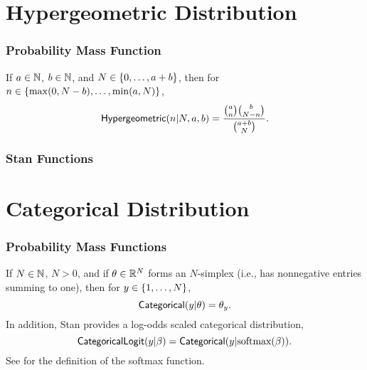 \section{Hypergeometric Distribution}

\subsubsection{Probability Mass Function}

If $a \in \mathbb{N}$, $b \in \mathbb{N}$, and $N \in \{ 0,\ldots,a+b \}$,
then for $n \in \{ \max(0,N-b),\ldots,\min(a,N) \}$,
\[
\mbox{\sf Hypergeometric}(n|N,a,b)
=
\frac{\normalsize{\binom{a}{n} \binom{b}{N - n}}}
     {\normalsize{\binom{a + b}{N}}}.
\]



\subsubsection{Stan Functions}

\begin{description}
%

%
\end{description}
%
\begin{description}
\end{description}




\section{Categorical Distribution}\label{categorical-distribution.section}

\subsubsection{Probability Mass Functions}

If $N \in \mathbb{N}$, $N > 0$, and if $\theta \in \mathbb{R}^N$ forms an
$N$-simplex (i.e., has nonnegative entries summing to one), then for
$y \in \{ 1,\ldots,N \}$,
%
\[
\mbox{\sf Categorical}(y|\theta) = \theta_y.
\]
%
In addition, Stan provides a log-odds scaled categorical distribution,
%
\[
\mbox{\sf CategoricalLogit}(y|\beta)
= \mbox{\sf Categorical}(y|\mbox{softmax}(\beta)).
\]
%
See  for the definition of the softmax function.


